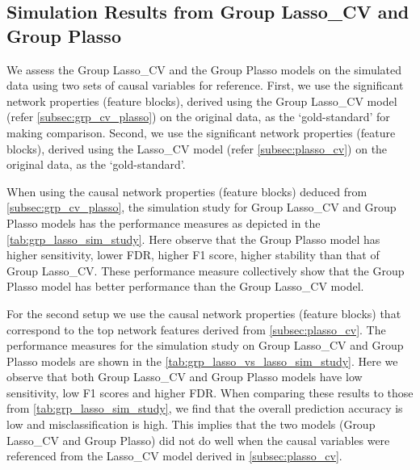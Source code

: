 \subsection{Simulation Results from Group Lasso\_CV and Group Plasso} \label{subsec:simstudy_grplasso}
We assess the Group Lasso\_CV and the Group Plasso models on the simulated data using two sets of causal variables for reference. First, we use the significant network properties (feature blocks), derived using the Group Lasso\_CV model (refer \autoref{subsec:grp_cv_plasso}) on the original data, as the \lq gold-standard' for making comparison. Second, we use the significant network properties (feature blocks), derived using the Lasso\_CV model (refer \autoref{subsec:plasso_cv}) on the original data, as the \lq gold-standard'.\par
When using the causal network properties (feature blocks) deduced from \autoref{subsec:grp_cv_plasso}, the simulation study for Group Lasso\_CV and Group Plasso models has the performance measures as depicted in the \autoref{tab:grp_lasso_sim_study}. Here observe that the Group Plasso model has higher sensitivity, lower FDR, higher F1 score, higher stability than that of Group Lasso\_CV. These performance measure collectively show that the Group Plasso model has better performance than the Group Lasso\_CV model.\\
\begin{table}[H]
\caption{Performance measures of Group Lasso\_CV and Group Plasso models when using variables from Group Lasso\_CV as reference.}
\label{tab:grp_lasso_sim_study}
\end{table}
For the second setup we use the causal network properties (feature blocks) that correspond to the top network features derived from \autoref{subsec:plasso_cv}. The performance measures for the simulation study on Group Lasso\_CV and Group Plasso models are shown in the \autoref{tab:grp_lasso_vs_lasso_sim_study}. Here we observe that both Group Lasso\_CV and Group Plasso models have low sensitivity, low F1 scores and higher FDR. When comparing these results to those from \autoref{tab:grp_lasso_sim_study}, we find that the overall prediction accuracy is low and misclassification is high. This implies that the two models (Group Lasso\_CV and Group Plasso) did not do well when the causal variables were referenced from the Lasso\_CV model derived in \autoref{subsec:plasso_cv}.\\

